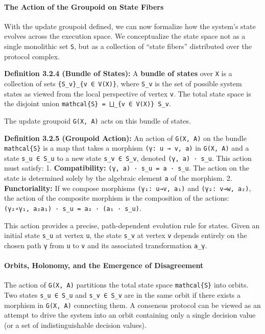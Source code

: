 \documentclass[
]{article}
\begin{document}
\paragraph{The Action of the Groupoid on State
Fibers}\label{the-action-of-the-groupoid-on-state-fibers}

With the update groupoid defined, we can now formalize how the system's
state evolves across the execution space. We conceptualize the state
space not as a single monolithic set \texttt{S}, but as a collection of
``state fibers'' distributed over the protocol complex.

\textbf{Definition 3.2.4 (Bundle of States):} A \textbf{bundle of
states} over \texttt{X} is a collection of sets
\texttt{\{S\_v\}\_\{v\ ∈\ V(X)\}}, where \texttt{S\_v} is the set of
possible system states as viewed from the local perspective of vertex
\texttt{v}. The total state space is the disjoint union
\texttt{mathcal\{S\}\ =\ ⨆\_\{v\ ∈\ V(X)\}\ S\_v}.

The update groupoid \texttt{G(X,\ A)} acts on this bundle of states.

\textbf{Definition 3.2.5 (Groupoid Action):} An action of
\texttt{G(X,\ A)} on the bundle \texttt{mathcal\{S\}} is a map that
takes a morphism \texttt{(γ:\ u\ →\ v,\ a)} in \texttt{G(X,\ A)} and a
state \texttt{s\_u\ ∈\ S\_u} to a new state \texttt{s\_v\ ∈\ S\_v},
denoted \texttt{(γ,\ a)\ ·\ s\_u}. This action must satisfy: 1.
\textbf{Compatibility:} \texttt{(γ,\ a)\ ·\ s\_u\ =\ a\ ·\ s\_u}. The
action on the state is determined solely by the algebraic element
\texttt{a} of the morphism. 2. \textbf{Functoriality:} If we compose
morphisms \texttt{(γ₁:\ u→v,\ a₁)} and \texttt{(γ₂:\ v→w,\ a₂)}, the
action of the composite morphism is the composition of the actions:
\texttt{(γ₂∘γ₁,\ a₂a₁)\ ·\ s\_u\ =\ a₂\ ·\ (a₁\ ·\ s\_u)}.

This action provides a precise, path-dependent evolution rule for
states. Given an initial state \texttt{s\_u} at vertex \texttt{u}, the
state \texttt{s\_v} at vertex \texttt{v} depends entirely on the chosen
path \texttt{γ} from \texttt{u} to \texttt{v} and its associated
transformation \texttt{a\_γ}.

\paragraph{Orbits, Holonomy, and the Emergence of
Disagreement}\label{orbits-holonomy-and-the-emergence-of-disagreement}

The action of \texttt{G(X,\ A)} partitions the total state space
\texttt{mathcal\{S\}} into orbits. Two states \texttt{s\_u\ ∈\ S\_u} and
\texttt{s\_v\ ∈\ S\_v} are in the same orbit if there exists a morphism
in \texttt{G(X,\ A)} connecting them. A consensus protocol can be viewed
as an attempt to drive the system into an orbit containing only a single
decision value (or a set of indistinguishable decision values).
\end{document}
